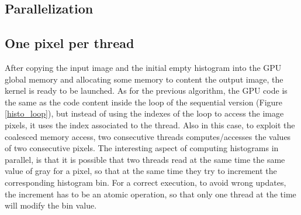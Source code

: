 \documentclass[a4paper]{article}
\begin{document}
\subsection{Parallelization}
\label{sec:p2}
\subsection{One pixel per thread}
\label{sec:fm2}
After copying the input image and the initial empty histogram into the GPU global memory and allocating some memory to content the output image, the kernel is ready to be launched. As for the previous algorithm, the GPU code is the same as the code content inside the loop of the sequential version (Figure \ref{histo_loop}), but instead of using the indexes of the loop to access the image pixels, it uses the index associated to the thread. Also in this case, to exploit the coalesced memory access, two consecutive threads computes/accesses the values of two consecutive pixels. The interesting aspect of computing histograms in parallel, is that it is possible that two threads read at the same time the same value of gray for a pixel, so that at the same time they try to increment the corresponding histogram bin. For a correct execution, to avoid wrong updates, the increment has to be an atomic operation, so that only one thread at the time will modify the bin value. 
\end{document}
